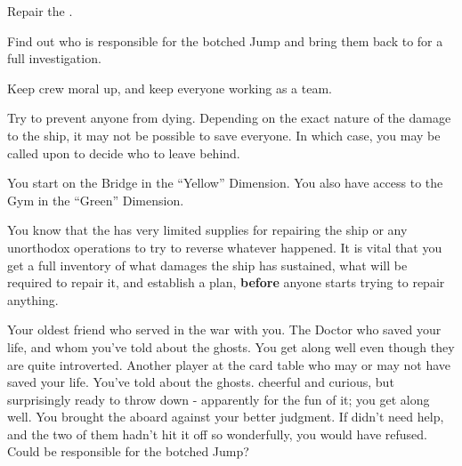 \documentclass[char]{TMFHope}
\begin{document}
\begin{itemz}[Goals]
	\item Repair the \pNew{}.
	\item Find out who is responsible for the botched Jump and bring them back to \pHome{} for a full investigation.
	\item Keep crew moral up, and keep everyone working as a team.
	\item Try to prevent anyone from dying. Depending on the exact nature of the damage to the ship, it may not be possible to save everyone. In which case, you may be called upon to decide who to leave behind.
\end{itemz}

\begin{itemz}[Notes]
	\item You start on the Bridge in the ``Yellow'' Dimension. You also have access to the Gym in the ``Green'' Dimension. 
	\item You know that the \pNew{} has very limited supplies for repairing the ship or any unorthodox operations to try to reverse whatever happened. It is vital that you get a full inventory of what damages the ship has sustained, what will be required to repair it, and establish a plan, {\bf before} anyone starts trying to repair anything.
\end{itemz}

\begin{contacts}
	\contact{\cXO{}} Your oldest friend who served in the war with you.
	\contact{\cMed{}} The Doctor who saved your life, and whom you've told about the ghosts. You get along well even though they are quite introverted.
	\contact{\cSci{}} Another player at the card table who may or may not have saved your life. You've told \cSci{\them} about the ghosts. \cSci{\They} \cSci{\are} cheerful and curious, but surprisingly ready to throw down - apparently for the fun of it; you get along well.
	\contact{\cBoy{}} You brought the \cBoy{\kid} aboard against your better judgment. If \cEng{} didn't need help, and the two of them hadn't hit it off so wonderfully, you would have refused. Could \cBoy{} be responsible for the botched Jump?
\end{contacts}
\end{document}
